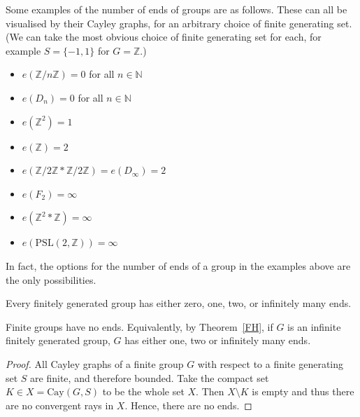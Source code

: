 \begin{example}
    Some examples of the number of ends of groups are as follows. These can all be visualised by their Cayley graphs, for an arbitrary choice of finite generating set. (We can take the most obvious choice of finite generating set for each, for example \(S = \{-1,1\}\) for \(G = \mathbb{Z}\).)
    \begin{multicols}{2}
    \begin{itemize}
        \item \(e(\mathbb{Z}/n\mathbb{Z}) = 0\) for all \(n \in \mathbb{N}\)
        \item \(e(D_n) = 0\) for all \(n \in \mathbb{N}\)
        \item \(e(\mathbb{Z}^2) = 1\)
        \item \(e(\mathbb{Z}) = 2\)
    \end{itemize}
    
        \columnbreak
        
    \begin{itemize}
        \item \(e(\mathbb{Z}/2\mathbb{Z} * \mathbb{Z}/2\mathbb{Z}) = e(D_{\infty}) = 2\)
        \item \(e(F_2) = \infty\)
        \item \(e(\mathbb{Z}^2 * \mathbb{Z}) = \infty\)
        \item \(e(\mathrm{PSL}(2,\mathbb{Z})) = \infty\)
    \end{itemize}
    \end{multicols}
\end{example}

In fact, the options for the number of ends of a group in the examples above are the only possibilities.

\begin{theorem} \cite[p.~146--147]{BrHa11}
\label{FH}
    Every finitely generated group has either zero, one, two, or infinitely many ends.
\end{theorem}

\begin{corollary}
    Finite groups have no ends. Equivalently, by Theorem~\ref{FH}, if \(G\) is an infinite finitely generated group, \(G\) has either one, two or infinitely many ends.
\end{corollary}

\begin{proof} %
    All Cayley graphs of a finite group \(G\) with respect to a finite generating set \(S\) are finite, and therefore bounded. Take the compact set \(K \in X = \mathrm{Cay}(G,S)\) to be the whole set \(X\). Then \(X \setminus K\) is empty and thus there are no convergent rays in \(X\). Hence, there are no ends.
\end{proof}

